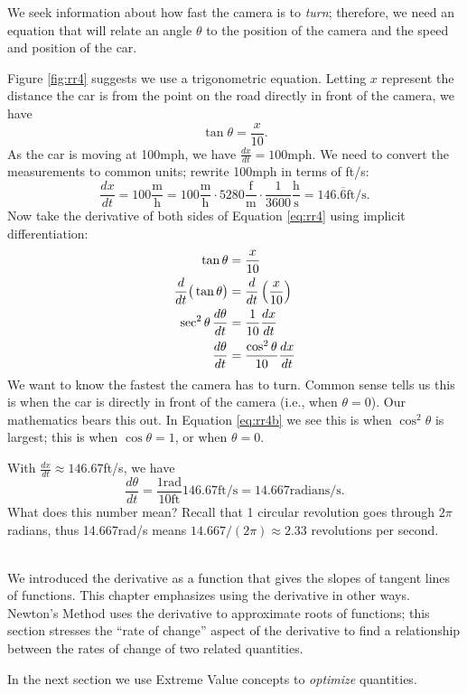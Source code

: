 {We seek information about how fast the camera is to \textit{turn}; therefore, we need an equation that will relate an angle $\theta$ to the position of the camera and the speed and position of the car.

Figure \ref{fig:rr4} suggests we use a trigonometric equation. Letting $x$ represent the distance the car is from the point on the road directly in front of the camera, we have \begin{equation}\tan \theta = \frac{x}{10}.\label{eq:rr4}\end{equation} As the car is moving at 100mph, we have $\frac{dx}{dt} = 100$mph. We need to convert the measurements to common units; rewrite 100mph in terms of ft/s:
$$\frac{dx}{dt} = 100\frac{\text{m}}{\text{h}} = 100\frac{\text{m}}{\text{h}}\cdot5280\frac{\text{f}}{\text{m}}\cdot\frac{1}{3600}\frac{\text{h}}{\text{s}} =146.\overline{6}\text{ft/s}.$$
Now take the derivative of both sides of Equation \eqref{eq:rr4} using implicit differentiation:
\begin{align}
		\tan \theta &= \frac{x}{10} \notag \\
		\frac{d}{dt}\big(\tan \theta\big) &= \frac{d}{dt}\left(\frac{x}{10}\right)\notag \\
		\sec^2\theta\,\frac{d\theta}{dt} &= \frac{1}{10}\frac{dx}{dt}\notag\\
		\frac{d\theta}{dt} &= \frac{\cos^2\theta}{10}\frac{dx}{dt}\label{eq:rr4b}
\end{align}
We want to know the fastest the camera has to turn. Common sense tells us this is when the car is directly in front of the camera (i.e., when $\theta = 0$). Our mathematics bears this out. In Equation \eqref{eq:rr4b} we see this is when $\cos^2\theta$ is largest; this is when $\cos \theta = 1$, or when $\theta = 0$.

With $\frac{dx}{dt} \approx 146.67$ft/s, we have 
	$$\frac{d\theta}{dt} = \frac{1\text{rad}}{10\text{ft}}146.67\text{ft/s} = 14.667\text{radians/s}.$$
What does this number mean? Recall that 1 circular revolution goes through $2\pi$ radians, thus 14.667rad/s means $14.667/(2\pi)\approx 2.33$ revolutions per second.
}\\

We introduced the derivative as a function that gives the slopes of tangent lines of functions. This chapter emphasizes using the derivative in other ways. Newton's Method uses the derivative to approximate roots of functions; this section stresses the ``rate of change'' aspect of the derivative to find a relationship between the rates of change of two related quantities. 

In the next section we use Extreme Value concepts to \textit{optimize} quantities. 

